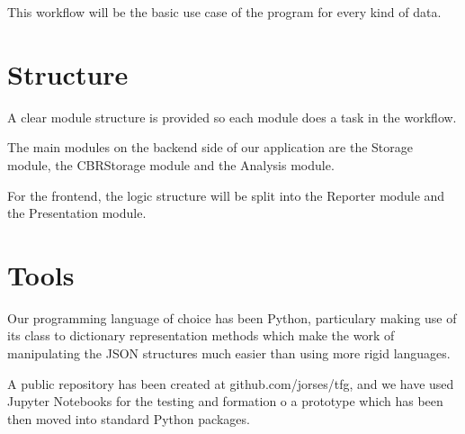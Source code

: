 This workflow will be the basic use case of the program for every kind of data.

\section{Structure}
\label{cap1:sec:structure}
A clear module structure is provided so each module does a task in the workflow.

The main modules on the backend side of our application are the Storage module, the CBRStorage module and the Analysis module.

For the frontend, the logic structure will be split into the Reporter module and the Presentation module.

\section{Tools}
\label{cap1:sec:tools}

Our programming language of choice has been Python, particulary making use of its class to dictionary representation methods which make the work of manipulating the JSON structures much easier than using more rigid languages.

A public repository has been created at github.com/jorses/tfg, and we have used Jupyter Notebooks for the testing and formation o a prototype which has been then moved into standard Python packages.
